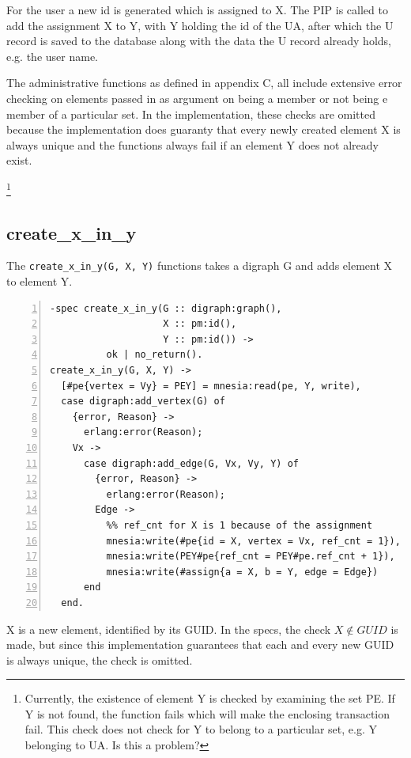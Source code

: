 \documentclass[12pt,a4paper,titlepage]{book}
\begin{document}
	For the user a new id is generated which is assigned to X. The PIP is called to add the assignment X to Y, with Y holding the id of the UA, after which the U record is saved to the database along with the data the U record already holds, e.g. the user name.
		
	The administrative functions as defined in appendix C, all include extensive error checking on elements passed in as argument on being a member or not being e member of a particular set. In the implementation, these checks are omitted because the implementation does guaranty that every newly created element X is always unique and the functions always fail if an element Y does not already exist.
	
	\footnote{Currently, the existence of element Y is checked by examining the set PE. If Y is not found, the function fails which will make the enclosing transaction fail. This check does not check for Y to belong to a particular set, e.g. Y belonging to UA. Is this a problem?}
	
	\subsection{create\_x\_in\_y}
	
	The \lstinline|create_x_in_y(G, X, Y)| functions takes a digraph G and adds element X to element Y.
		
	\begin{lstlisting}[caption={create\_x\_in\_y}, basicstyle=\footnotesize, breaklines=false, numbers=left]
-spec create_x_in_y(G :: digraph:graph(),
                    X :: pm:id(),
                    Y :: pm:id()) ->
          ok | no_return().
create_x_in_y(G, X, Y) ->
  [#pe{vertex = Vy} = PEY] = mnesia:read(pe, Y, write),
  case digraph:add_vertex(G) of
    {error, Reason} ->
      erlang:error(Reason);
    Vx ->
      case digraph:add_edge(G, Vx, Vy, Y) of
        {error, Reason} ->
          erlang:error(Reason);
        Edge ->
          %% ref_cnt for X is 1 because of the assignment
          mnesia:write(#pe{id = X, vertex = Vx, ref_cnt = 1}),
          mnesia:write(PEY#pe{ref_cnt = PEY#pe.ref_cnt + 1}),
          mnesia:write(#assign{a = X, b = Y, edge = Edge})
      end
  end. \end{lstlisting}		
	
	X is a new element, identified by its GUID. In the specs, the check $ X \notin GUID $ is made, but since this implementation guarantees that each and every new GUID is always unique, the check is omitted.
	
\end{document}

